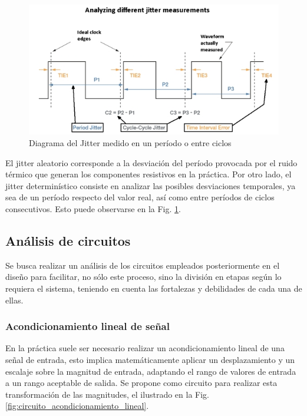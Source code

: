 \begin{figure}[H]
    \centering
    \includegraphics[scale=0.5]{../EJ3/Recursos/different-jitter-measurements.jpg}
    \caption{Diagrama del Jitter medido en un per\'iodo o entre ciclos}
    \label{fig:jitter_diagram}
\end{figure}

El jitter aleatorio corresponde a la desviaci\'on del per\'iodo provocada por el ruido t\'ermico que generan los componentes resistivos en la pr\'actica.
Por otro lado, el jitter determin\'istico consiste en analizar las posibles desviaciones temporales, ya sea de un per\'iodo respecto del valor real, as\'i
como entre per\'iodos de ciclos consecutivos. Esto puede observarse en la Fig. \ref{fig:jitter_diagram}.

\subsection{An\'alisis de circuitos}
Se busca realizar un an\'alisis de los circuitos empleados posteriormente en el dise\~no para facilitar, no s\'olo este proceso,
sino la divisi\'on en etapas seg\'un lo requiera el sistema, teniendo en cuenta las fortalezas y debilidades de cada una de ellas.

\subsubsection{Acondicionamiento lineal de se\~nal}
En la pr\'actica suele ser necesario realizar un acondicionamiento lineal de una se\~nal de entrada, esto implica matem\'aticamente aplicar un desplazamiento
y un escalaje sobre la magnitud de entrada, adaptando el rango de valores de entrada a un rango aceptable de salida. Se propone como circuito para realizar esta transformaci\'on
de las magnitudes, el ilustrado en la Fig. \ref{fig:circuito_acondicionamiento_lineal}.

